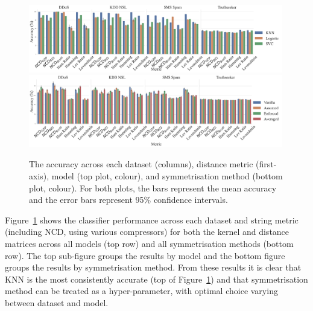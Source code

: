 \documentclass[preprint,12pt]{article}
\begin{document}
\begin{figure}[!htb]
    \centering
    \includegraphics[width=0.99\textwidth]{images/accuracy_vs_metric.pdf}
    \hfill
    \includegraphics[width=0.99\textwidth]{images/accuracy_vs_symmetry.pdf}
    \caption{
    The accuracy across each dataset (columns), distance metric (first-axis),  model (top plot, colour), and symmetrisation method (bottom plot, colour). 
    For both plots, the bars represent the mean accuracy and the error bars represent 95\% confidence intervals.
    }
    \label{fig:acc}
\end{figure}

Figure~\ref{fig:acc} shows the classifier performance across each dataset and string metric (including NCD, using various compressors) for both the kernel and distance matrices across all models (top row) and all symmetrisation methods (bottom row). 
The top sub-figure groups the results by model and the bottom figure groups the results by symmetrisation method.
From these results it is clear that KNN is the most consistently accurate (top of Figure~\ref{fig:acc}) and that symmetrisation method can be treated as a hyper-parameter, with optimal choice varying between dataset and model.
\end{document}

